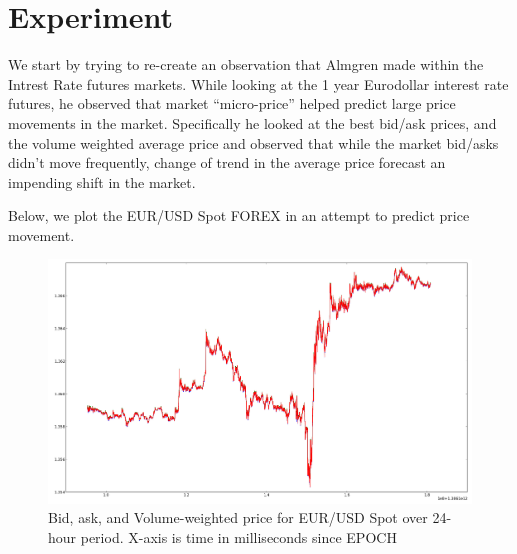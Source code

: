\section{Experiment}
\label{experiment}
We start by trying to re-create an observation that Almgren made within the Intrest Rate futures markets.
While looking at the 1 year Eurodollar interest rate futures, he observed that market ``micro-price''
helped predict large price movements in the market.
Specifically he looked at the best bid/ask prices, and the volume weighted average price and observed
that while the market bid/asks didn't move frequently, change of trend in the average price
forecast an impending shift in the market.

Below, we plot the EUR/USD Spot FOREX in an attempt to predict price movement.


\begin{figure}[th]
  \includegraphics[width=\textwidth]{figures/smoothed_avg_20131204_5.png}
  \caption{Bid, ask, and Volume-weighted price for EUR/USD Spot over 24-hour period. X-axis is time in milliseconds since EPOCH}
  \label{bidaskavg}
\end{figure}

